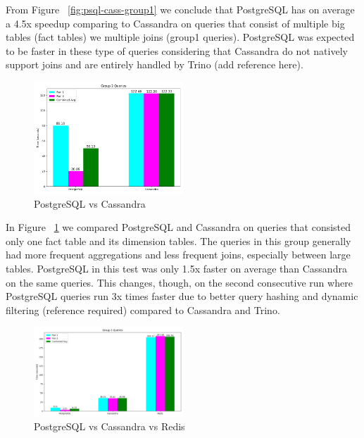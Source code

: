 \documentclass[conference]{IEEEtran}
\begin{document}
From Figure ~\ref{fig:psql-cass-group1} we conclude that PostgreSQL has on average a 4.5x speedup comparing to Cassandra on queries that consist of multiple big tables (fact tables) we multiple joins (group1 queries). PostgreSQL was expected to be faster in these type of queries considering that Cassandra do not natively support joins and are entirely handled by Trino (add reference here).

\begin{figure}[h]
    \centering
    \includegraphics[width=0.5\textwidth]{images/DBs_bench_no_distro/group2.png}
    \caption{PostgreSQL vs Cassandra}
    \label{fig:psql-cass-group2}
\end{figure}

In Figure ~\ref{fig:psql-cass-group2} we compared PostgreSQL and Cassandra on queries that consisted only one fact table and its dimension tables. The queries in this group generally had more frequent aggregations and less frequent joins, especially between large tables. PostgreSQL in this test was only 1.5x faster on average than Cassandra on the same queries. This changes, though, on the second consecutive run where PostgreSQL queries run 3x times faster due to better query hashing and dynamic filtering (reference required) compared to Cassandra and Trino.

\begin{figure}[h]
    \centering
    \includegraphics[width=0.5\textwidth]{images/DBs_bench_no_distro/group3.png}
    \caption{PostgreSQL vs Cassandra vs Redis}
    \label{fig:store_sales_er_diagram}
\end{figure}
\end{document}
